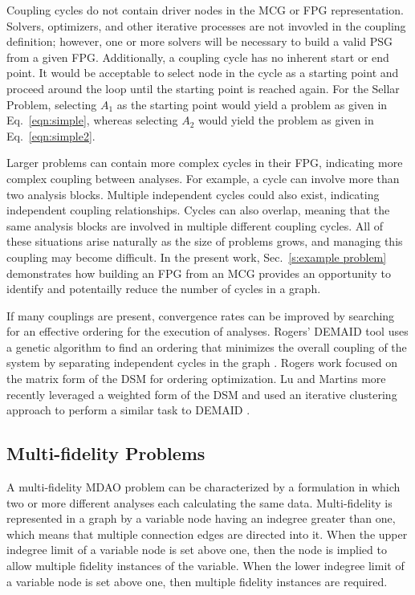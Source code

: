   Coupling cycles do not contain driver nodes in the MCG or FPG representation. 
  Solvers, optimizers, and other iterative processes are not invovled in the coupling 
  definition; however, one or more solvers will be necessary to build a valid PSG from a given FPG. 
  Additionally, a coupling cycle has no inherent start or end point. It would be acceptable to select
  node in the cycle as a starting point and proceed around the
  loop until the starting point is reached again. For the Sellar Problem, selecting 
  $A_1$ as the starting point would yield a problem as given in 
  Eq.~\ref{eqn:simple}, whereas selecting $A_2$ would yield the problem as given in 
  Eq.~\ref{eqn:simple2}.

  Larger problems can contain more complex cycles in their FPG, indicating more 
  complex coupling between analyses. For example, a cycle can involve more than 
   two analysis blocks. Multiple independent cycles could also exist, indicating 
  independent coupling relationships. Cycles can also overlap, meaning that the same analysis 
  blocks are involved in multiple different coupling cycles. All of these situations
  arise naturally as the size of problems grows, and managing this coupling may
  become difficult. In the present work, Sec.~\ref{s:example problem}
  demonstrates how building an FPG from an MCG provides an opportunity to 
  identify and potentailly reduce the number of cycles in a graph. 

  If many couplings are present, convergence rates can be improved by 
  searching for an effective ordering for the execution of analyses.
  Rogers' DEMAID tool uses a genetic algorithm to find an ordering that minimizes 
  the overall coupling of the system by separating independent cycles in the 
  graph \cite{rogers1996,rogers1996demaid}. Rogers work focused on the matrix 
  form of the DSM for ordering optimization. Lu and Martins more recently leveraged 
  a weighted form of the DSM and used an iterative clustering approach to perform a 
  similar task to DEMAID \cite{Lu2012}.

\subsection{Multi-fidelity Problems}
  \label{ss:multi-fideliy problems}
  A multi-fidelity MDAO problem can be characterized by a formulation in which 
  two or more different analyses each calculating the same data. Multi-fidelity 
  is represented in a graph by a variable node having an indegree greater than 
  one, which means that multiple connection edges are directed into it. When the 
  upper indegree limit of a variable node is set above one, then the node is 
  implied to allow multiple fidelity instances of the variable. When the lower 
  indegree limit of a variable node is set above one, then multiple fidelity instances are required.


